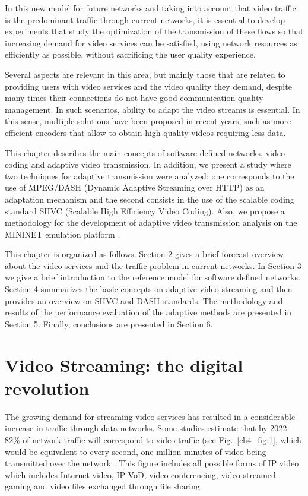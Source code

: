 In this new model for future networks and taking into account that video traffic is the predominant traffic through current networks, it is essential to develop experiments that study the optimization of the transmission of these flows so that increasing demand for video services can be satisfied, using network resources as efficiently as possible, without sacrificing the user quality experience.

Several aspects are relevant in this area, but mainly those that are related to providing users with video services and the video quality they demand, despite many times their connections do not have good communication quality management. In such scenarios, ability to adapt the video streams is essential. In this sense, multiple solutions have been proposed in recent years, such as more efficient encoders that allow to obtain high quality videos requiring less data.

This chapter describes the main concepts of software-defined networks, video coding and adaptive video transmission. In addition, we present a study where two techniques for adaptive transmission were analyzed: one corresponds to the use of MPEG/DASH (Dynamic Adaptive Streaming over HTTP) as an adaptation mechanism and the second consists in the use of the scalable coding standard SHVC (Scalable High Efficiency Video Coding). Also, we propose a methodology for the development of adaptive video transmission analysis on the MININET emulation platform \cite{lantz_2017}.

This chapter is organized as follows. Section 2 gives a brief forecast overview about the video services and the traffic problem in current networks. In Section 3 we give a brief introduction to the reference model for software defined networks. Section 4 summarizes the basic concepts on adaptive video streaming and then provides an overview on SHVC and DASH standards. The methodology and results of the performance evaluation of the adaptive methods are presented in Section 5. Finally, conclusions are presented in Section 6.

\section{Video Streaming: the digital revolution}
\label{sec:4.2}

The growing demand for streaming video services has resulted in a considerable increase in traffic through data networks. Some studies estimate that by 2022 82\% of network traffic will correspond to video traffic (see Fig.~\ref{ch4_fig:1}, which would be equivalent to every second, one million minutes of video being transmitted over the network \cite{Cisco_2019}. This figure includes all possible forms of IP video which includes Internet video, IP VoD, video conferencing, video-streamed gaming and video files exchanged through file sharing.  

